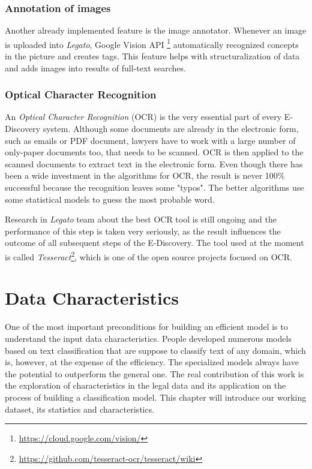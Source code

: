 \documentclass[
  digital, %
  notable,   %
  nolof,     %
  nolot,     %
]{fithesis3}
\begin{document}
\subsection*{Annotation of images}
Another already implemented feature is the image annotator.
Whenever an image is uploaded into \textit{Legato}, Google Vision API \footnote{\url{https://cloud.google.com/vision/}} automatically recognized concepts in the picture and creates tags.
This feature helps with structuralization of data and adds images into results of full-text searches.

\subsection*{Optical Character Recognition}
An \textit{Optical Character Recognition} (OCR) is the very essential part of every E-Discovery system.
Although some documents are already in the electronic form, such as emails or PDF document, lawyers have to work with a large number of only-paper documents too, that needs to be scanned.
OCR is then applied to the scanned documents to extract text in the electronic form.
Even though there has been a wide investment in the algorithms for OCR, the result is never 100\% successful because the recognition leaves some "typos".
The better algorithms use some statistical models to guess the most probable word.

Research in \textit{Legato} team about the best OCR tool is still ongoing and the performance of this step is taken very seriously, as the result influences the outcome of all subsequent steps of the E-Discovery. The tool used at the moment is called \textit{Tesseract}\footnote{\url{https://github.com/tesseract-ocr/tesseract/wiki}}, which is one of the open source projects focused on OCR.



\chapter{Data Characteristics}
\label{chp:data_characteristics}
One of the most important preconditions for building an efficient model is to understand the input data characteristics.
People developed numerous models based on text classification that are suppose to classify text of any domain, which is, however, at the expense of the efficiency.
The specialized models always have the potential to outperform the general one.
The real contribution of this work is the exploration of characteristics in the legal data and its application on the process of building a classification model.
This chapter will introduce our working dataset, its statistics and characteristics.
\end{document}
